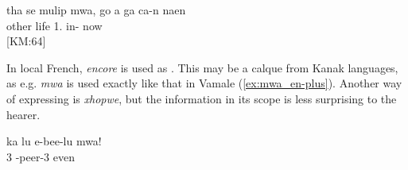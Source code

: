 \ea \label{ex:mulip_mwa}
\gll tha se mulip {mwa}, go a ga ca-n naen\\
  other life    1. in- now\\
\glt {} {[KM:64]}
\z

In local French, \textit{encore}  is used as  . This may be a calque from Kanak languages, as e.g. \textit{mwa} is used exactly like that in Vamale (\ref{ex:mwa_en-plus}). Another way of expressing  is \textit{xhopwe}, but the information in its scope is less surprising to the hearer.

\ea \label{ex:mwa_en-plus}
\gll ka lu e-bee-lu mwa!\\
  3 -peer-3 even\\
\glt {}
\z
